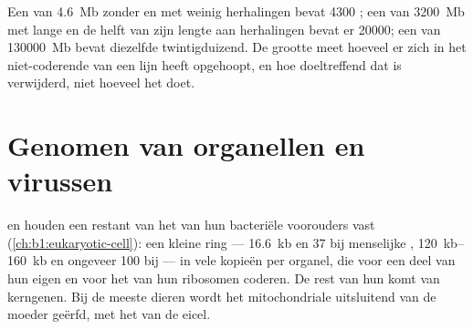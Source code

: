 \begin{example}\label{ex:b1:genomes:sizes}
Een  van \qty{4.6}{Mb} zonder  en met weinig herhalingen bevat
\num{4300} ; een van \qty{3200}{Mb} met lange  en de helft van zijn
lengte aan herhalingen bevat er \num{20000}; een van \qty{130000}{Mb} bevat
diezelfde twintigduizend. De grootte meet hoeveel er zich in het niet-coderende 
van een lijn heeft opgehoopt, en hoe doeltreffend dat is verwijderd, niet hoeveel
het  doet.
\end{example}

\section{Genomen van organellen en virussen}

\begin{definition}\label{def:b1:genomes:organelle}
 en  houden een restant van het  van hun
bacteriële voorouders vast (\cref{ch:b1:eukaryotic-cell}): een kleine ring ---
\qty{16.6}{kb} en 37  bij menselijke , \qtyrange{120}{160}{kb} en
ongeveer 100  bij  --- in vele kopieën per organel, die voor een
deel van hun eigen  en voor het  van hun ribosomen coderen. De rest van
hun  komt van kerngenen. Bij de meeste dieren wordt het mitochondriale
 uitsluitend van de moeder geërfd, met het  van de eicel.
\end{definition}


